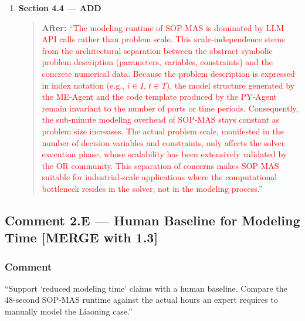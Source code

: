 \documentclass[11pt,a4paper]{article}
\begin{document}
\begin{enumerate}
\item \textbf{Section 4.4 --- ADD}
\begin{quote}
\textbf{After:} ``\textcolor{red}{The modeling runtime of SOP-MAS is dominated by LLM API calls rather than problem scale. This scale‑independence stems from the architectural separation between the abstract symbolic problem description (parameters, variables, constraints) and the concrete numerical data. Because the problem description is expressed in index notation (e.g., $i \in I$, $t \in T$), the model structure generated by the ME‑Agent and the code template produced by the PY‑Agent remain invariant to the number of ports or time periods. Consequently, the sub‑minute modeling overhead of SOP‑MAS stays constant as problem size increases. The actual problem scale, manifested in the number of decision variables and constraints, only affects the solver execution phase, whose scalability has been extensively validated by the OR community. This separation of concerns makes SOP‑MAS suitable for industrial‑scale applications where the computational bottleneck resides in the solver, not in the modeling process.}''
\end{quote}
\end{enumerate}

\subsection{Comment 2.E --- Human Baseline for Modeling Time \textbf{[MERGE with 1.3]}}

\subsubsection{Comment}
``Support `reduced modeling time' claims with a human baseline. Compare the 48-second SOP-MAS runtime against the actual hours an expert requires to manually model the Liaoning case.''
\end{document}
